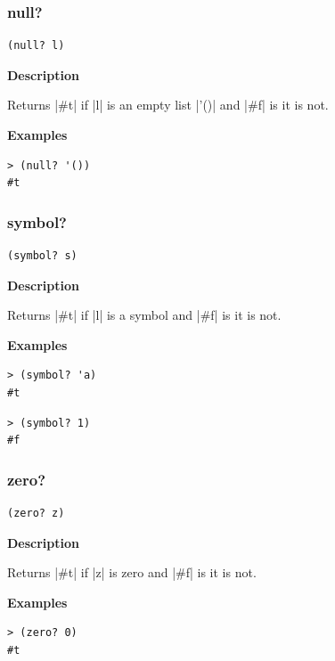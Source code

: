 \documentclass[a4paper]{article}
\begin{document}
\subsubsection{null?}

\begin{lstlisting}[frame=none]
(null? l)
\end{lstlisting}

\textbf{Description}

Returns |#t| if |l| is an empty list |'()| and |#f| is it is not.

\textbf{Examples}

\begin{lstlisting}
> (null? '())
#t
\end{lstlisting}

\subsubsection{symbol?}

\begin{lstlisting}[frame=none]
(symbol? s)
\end{lstlisting}

\textbf{Description}

Returns |#t| if |l| is a symbol and |#f| is it is not.

\textbf{Examples}

\begin{lstlisting}
> (symbol? 'a)
#t
\end{lstlisting}

\begin{lstlisting}
> (symbol? 1)
#f
\end{lstlisting}

\subsubsection{zero?}

\begin{lstlisting}[frame=none]
(zero? z)
\end{lstlisting}

\textbf{Description}

Returns |#t| if |z| is zero and |#f| is it is not.

\textbf{Examples}

\begin{lstlisting}
> (zero? 0)
#t
\end{lstlisting}
\end{document}
